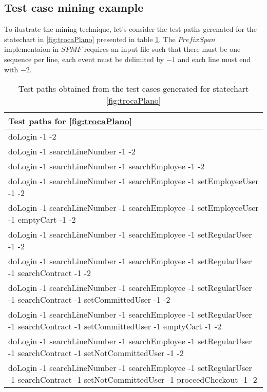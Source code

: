 \subsection{Test case mining example}
\label{exampleTestMin}

To ilustrate the mining technique, let's consider the test paths gerenated for the statechart in \ref{fig:trocaPlano} presented in table \ref{testPathsTrocaPlano}. The $PrefixSpan$ implementaion in $SPMF$ requires an input file such that there must be one sequence per line, each event must be delimited by $-1$ and each line must end with $-2$.


\begin{table}[h]
\begin{center}
\begin{tabular}{|p{15cm}|}
\hline
\textbf{Test paths for \ref{fig:trocaPlano}}\\ \hline

doLogin -1 -2 \\ \hline
doLogin -1 searchLineNumber -1 -2\\ \hline
doLogin -1 searchLineNumber -1 searchEmployee -1 -2\\ \hline
doLogin -1 searchLineNumber -1 searchEmployee -1 setEmployeeUser -1 -2\\ \hline
doLogin -1 searchLineNumber -1 searchEmployee -1 setEmployeeUser -1 emptyCart -1 -2\\ \hline
doLogin -1 searchLineNumber -1 searchEmployee -1 setRegularUser -1 -2\\ \hline
doLogin -1 searchLineNumber -1 searchEmployee -1 setRegularUser -1 searchContract -1 -2\\ \hline
doLogin -1 searchLineNumber -1 searchEmployee -1 setRegularUser -1 searchContract -1 setCommittedUser -1 -2\\ \hline
doLogin -1 searchLineNumber -1 searchEmployee -1 setRegularUser -1 searchContract -1 setCommittedUser -1 emptyCart -1 -2\\ \hline
doLogin -1 searchLineNumber -1 searchEmployee -1 setRegularUser -1 searchContract -1 setNotCommittedUser -1 -2\\ \hline
doLogin -1 searchLineNumber -1 searchEmployee -1 setRegularUser -1 searchContract -1 setNotCommittedUser -1 proceedCheckout -1 -2\\

\hline
\end{tabular}
\end{center}
\caption{Test paths obtained from the test cases generated for statechart \ref{fig:trocaPlano}}
\label{testPathsTrocaPlano}
\end{table}


